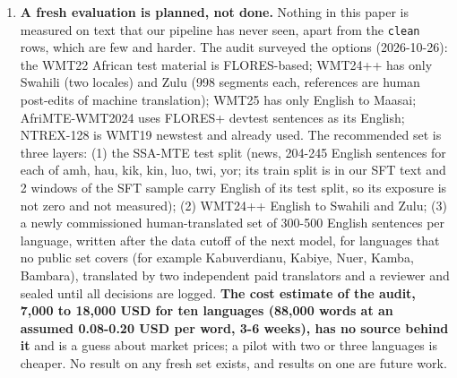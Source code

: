 \begin{enumerate}
  \textbf{The Ge\textquotesingle ez-script gap is described, not explained.} Amharic and Tigrinya are the languages in which the model is furthest behind NLLB (Section 6.8: the gap to NLLB-200 3.3B is 3.85 chrF++ over 44 languages and 3.32 over the 42 without them, which is the headline comparison; Amharic 19.0 and Tigrinya 11.0 alone) and Amharic dominates the wrapper\textquotesingle s gap in the judge comparison (Section 6.12). Leaving the two languages out of the headline is a choice about presentation because they are an outlier; it does not mean the gap is understood or unimportant. The mean gap to NLLB is skewed by a few languages (median 3.17 over all 44 and 2.78 over the 42; Kabuverdianu 21.0, Amharic 19.0 and Tigrinya 11.0 carry 30\% of the summed gap), and Kabuverdianu, a creole that is also our largest gain over SFT (+14.2), is kept in the headline (Section 6.8). We did not test any of four candidate causes: (a) capacity sharing of 270M parameters across 77 languages; (b) tokenisation (only 862 Ethiopic entries in the 262,144-token Gemma vocabulary; 3.03 and 3.46 tokens per word for Amharic and Tigrinya against 2.09 for Swahili); (c) the amount and quality of the Amharic and Tigrinya training data; (d) Gemma\textquotesingle s pretraining coverage of the two languages. NLLB is larger, trained on far more data and on many more language pairs, so the comparison with it cannot separate them, and the whole-document failure does not depend on the Ge\textquotesingle ez languages. Future work: a matched specialist-model and larger-model experiment; no such result is reported here.
\item
  \textbf{A fresh evaluation is planned, not done.} Nothing in this paper is measured on text that our pipeline has never seen, apart from the \texttt{clean} rows, which are few and harder. The audit surveyed the options (2026-10-26): the WMT22 African test material is FLORES-based; WMT24++ has only Swahili (two locales) and Zulu (998 segments each, references are human post-edits of machine translation); WMT25 has only English to Maasai; AfriMTE-WMT2024 uses FLORES+ devtest sentences as its English; NTREX-128 is WMT19 newstest and already used. The recommended set is three layers: (1) the SSA-MTE test split (news, 204-245 English sentences for each of amh, hau, kik, kin, luo, twi, yor; its train split is in our SFT text and 2 windows of the SFT sample carry English of its test split, so its exposure is not zero and not measured); (2) WMT24++ English to Swahili and Zulu; (3) a newly commissioned human-translated set of 300-500 English sentences per language, written after the data cutoff of the next model, for languages that no public set covers (for example Kabuverdianu, Kabiye, Nuer, Kamba, Bambara), translated by two independent paid translators and a reviewer and sealed until all decisions are logged. \textbf{The cost estimate of the audit, 7,000 to 18,000 USD for ten languages (88,000 words at an assumed 0.08-0.20 USD per word, 3-6 weeks), has no source behind it} and is a guess about market prices; a pilot with two or three languages is cheaper. No result on any fresh set exists, and results on one are future work.
\end{enumerate}

